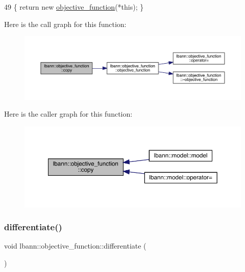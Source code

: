 \begin{DoxyCode}
49 \{ \textcolor{keywordflow}{return} \textcolor{keyword}{new} \hyperlink{classlbann_1_1objective__function_a89e96fddff19f13a6d3acafe4394fd65}{objective\_function}(*\textcolor{keyword}{this}); \}
\end{DoxyCode}
Here is the call graph for this function\+:\nopagebreak
\begin{figure}[H]
\begin{center}
\leavevmode
\includegraphics[width=350pt]{classlbann_1_1objective__function_a8ab03f0dc1d2c067b895f5859bacd810_cgraph}
\end{center}
\end{figure}
Here is the caller graph for this function\+:\nopagebreak
\begin{figure}[H]
\begin{center}
\leavevmode
\includegraphics[width=350pt]{classlbann_1_1objective__function_a8ab03f0dc1d2c067b895f5859bacd810_icgraph}
\end{center}
\end{figure}
\mbox{\label{classlbann_1_1objective__function_ae8b7314bdc12ba52d270b46a35acd138}} 
\subsubsection{\texorpdfstring{differentiate()}{differentiate()}}
{\footnotesize\ttfamily void lbann\+::objective\+\_\+function\+::differentiate (\begin{DoxyParamCaption}{ }\end{DoxyParamCaption})}

